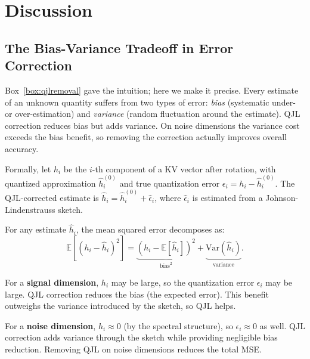 \documentclass[11pt]{article}
\newcommand{\E}{\mathbb{E}}
\newcommand{\Var}{\mathrm{Var}}
\begin{document}
\section{Discussion}
\label{sec:discussion}

\subsection{The Bias-Variance Tradeoff in Error Correction}

Box~\ref{box:qjlremoval} gave the intuition; here we make it precise.
Every estimate of an unknown quantity suffers from two types of error:
\emph{bias} (systematic under- or over-estimation) and \emph{variance}
(random fluctuation around the estimate).  QJL correction reduces bias but
adds variance.  On noise dimensions the variance cost exceeds the bias benefit,
so removing the correction actually improves overall accuracy.

Formally, let $h_i$ be the $i$-th component of a KV vector
after rotation, with quantized approximation $\hat{h}_i^{(0)}$ and true
quantization error $\epsilon_i = h_i - \hat{h}_i^{(0)}$.  The QJL-corrected
estimate is $\hat{h}_i = \hat{h}_i^{(0)} + \hat{\epsilon}_i$, where
$\hat{\epsilon}_i$ is estimated from a Johnson-Lindenstrauss sketch.

For any estimate $\hat{h}_i$, the mean squared error decomposes as:
\[
  \E[(h_i - \hat{h}_i)^2] = \underbrace{(h_i - \E[\hat{h}_i])^2}_{\text{bias}^2}
  + \underbrace{\Var(\hat{h}_i)}_{\text{variance}}.
\]

For a \textbf{signal dimension}, $h_i$ may be large, so the quantization error
$\epsilon_i$ may be large.  QJL correction reduces the bias (the expected
error).  This benefit outweighs the variance introduced by the sketch, so QJL
helps.

For a \textbf{noise dimension}, $h_i \approx 0$ (by the spectral structure),
so $\epsilon_i \approx 0$ as well.  QJL correction adds variance through the
sketch while providing negligible bias reduction.  Removing QJL on noise
dimensions reduces the total MSE.
\end{document}
